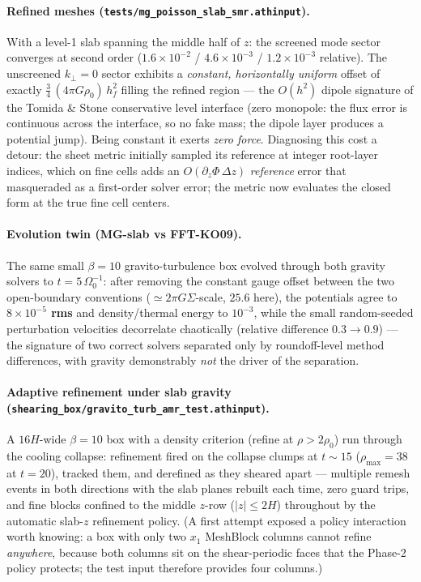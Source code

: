\documentclass[11pt]{article}
\newcommand{\file}[1]{\texttt{\small #1}}
\newcommand{\Om}{\Omega_0}
\begin{document}
\paragraph{Refined meshes (\file{tests/mg\_poisson\_slab\_smr.athinput}).} With a
level-1 slab spanning the middle half of $z$: the screened mode sector converges at
second order ($1.6\times10^{-2}$ / $4.6\times10^{-3}$ / $1.2\times10^{-3}$ relative).
The unscreened $k_\perp = 0$ sector exhibits a \emph{constant, horizontally uniform}
offset of exactly $\tfrac34\,(4\pi G\rho_0)\,h_f^2$ filling the refined region ---
the $O(h^2)$ dipole signature of the Tomida \& Stone conservative level interface
(zero monopole: the flux error is continuous across the interface, so no fake mass;
the dipole layer produces a potential jump). Being constant it exerts \emph{zero
force}. Diagnosing this cost a detour: the sheet metric initially sampled its
reference at integer root-layer indices, which on fine cells adds an
$O(\partial_z\Phi\,\Delta z)$ \emph{reference} error that masqueraded as a
first-order solver error; the metric now evaluates the closed form at the true fine
cell centers.

\paragraph{Evolution twin (MG-slab vs FFT-KO09).} The same small $\beta = 10$
gravito-turbulence box evolved through both gravity solvers to $t = 5\,\Om^{-1}$:
after removing the constant gauge offset between the two open-boundary conventions
($\simeq 2\pi G\Sigma$-scale, $25.6$ here), the potentials agree to
\textbf{$8\times10^{-5}$ rms} and density/thermal energy to $10^{-3}$, while the
small random-seeded perturbation velocities decorrelate chaotically (relative
difference $0.3 \to 0.9$) --- the signature of two correct solvers separated only
by roundoff-level method differences, with gravity demonstrably \emph{not} the
driver of the separation.

\paragraph{Adaptive refinement under slab gravity
(\file{shearing\_box/gravito\_turb\_amr\_test.athinput}).} A $16H$-wide $\beta = 10$
box with a density criterion (refine at $\rho > 2\rho_0$) run through the cooling
collapse: refinement fired on the collapse clumps at $t \sim 15$ ($\rho_{\max} = 38$
at $t = 20$), tracked them, and derefined as they sheared apart --- multiple remesh
events in both directions with the slab planes rebuilt each time, zero guard trips,
and fine blocks confined to the middle $z$-row ($|z| \le 2H$) throughout by the
automatic slab-$z$ refinement policy. (A first attempt exposed a policy interaction
worth knowing: a box with only two $x_1$ MeshBlock columns cannot refine
\emph{anywhere}, because both columns sit on the shear-periodic faces that the
Phase-2 policy protects; the test input therefore provides four columns.)
\end{document}
